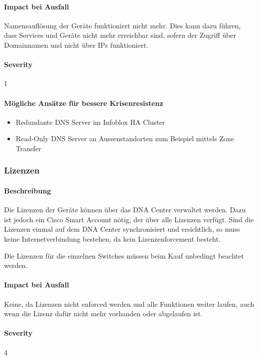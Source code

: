 \paragraph{Impact bei Ausfall}
Namensauflösung der Geräte funktioniert nicht mehr. Dies kann dazu führen, dass Services und Geräte nicht mehr erreichbar sind, sofern der Zugriff über Domainnamen und nicht über IPs funktioniert.

\paragraph{Severity} 1

\paragraph{Mögliche Ansätze für bessere Krisenresistenz}
\begin{itemize}
	\item Redundante DNS Server im Infoblox HA Cluster
	\item Read-Only DNS Server an Aussenstandorten zum Beispiel mittels Zone Transfer
\end{itemize}

\subsubsection{Lizenzen}
\paragraph{Beschreibung}
Die Lizenzen der Geräte können über das DNA Center verwaltet werden. Dazu ist jedoch ein Cisco Smart Account nötig, der über alle Lizenzen verfügt. Sind die Lizenzen einmal auf dem DNA Center synchronisiert und ersichtlich, so muss keine Internetverbindung bestehen, da kein Lizenzenforcement besteht.

Die Lizenzen für die einzelnen Switches müssen beim Kauf unbedingt beachtet werden.

\paragraph{Impact bei Ausfall}
Keine, da Lizenzen nicht enforced werden und alle Funktionen weiter laufen, auch wenn die Lizenz dafür nicht mehr vorhanden oder abgelaufen ist.

\paragraph{Severity} 4

